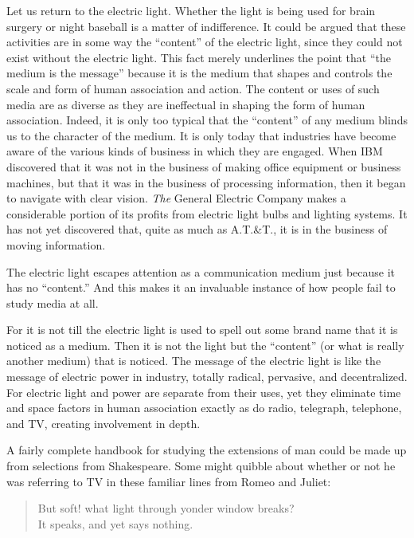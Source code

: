 \documentclass[]{book}
\theoremstyle{definition}
\theoremstyle{definition}
\theoremstyle{definition}
\theoremstyle{remark}
\begin{document}
Let us return to the electric light. Whether the light is being used for
brain surgery or night baseball is a matter of indifference. It could be
argued that these activities are in some way the ``content'' of the
electric light, since they could not exist without the electric light.
This fact merely underlines the point that ``the medium is the message''
because it is the medium that shapes and controls the scale and form of
human association and action. The content or uses of such media are as
diverse as they are ineffectual in shaping the form of human
association. Indeed, it is only too typical that the ``content'' of any
medium blinds us to the character of the medium. It is only today that
industries have become aware of the various kinds of business in which
they are engaged. When IBM discovered that it was not in the business of
making office equipment or business machines, but that it was in the
business of processing information, then it began to navigate with clear
vision. \emph{The} General Electric Company makes a considerable portion
of its profits from electric light bulbs and lighting systems. It has
not yet discovered that, quite as much as A.T.\&T., it is in the
business of moving information.

The electric light escapes attention as a communication medium just
because it has no ``content.'' And this makes it an invaluable instance
of how people fail to study media at all.

For it is not till the electric light is used to spell out some brand
name that it is noticed as a medium. Then it is not the light but the
``content'' (or what is really another medium) that is noticed. The
message of the electric light is like the message of electric power in
industry, totally radical, pervasive, and decentralized. For electric
light and power are separate from their uses, yet they eliminate time
and space factors in human association exactly as do radio, telegraph,
telephone, and TV, creating involvement in depth.

A fairly complete handbook for studying the extensions of man could be
made up from selections from Shakespeare. Some might quibble about
whether or not he was referring to TV in these familiar lines from Romeo
and Juliet:

\begin{quote}
But soft! what light through yonder window breaks?\\
It speaks, and yet says nothing.
\end{quote}
\end{document}
